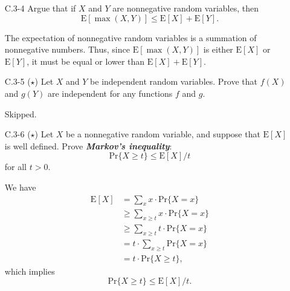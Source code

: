 \begin{enumerate}
\item[C.3{-}4]{Argue that if $X$ and $Y$ are nonnegative random variables, then
\[
  \text{E}[\max(X, Y)] \le \text{E}[X] + \text{E}[Y].
\]
}

\begin{framed}
The expectation of nonnegative random variables is a summation of nonnegative
numbers. Thus, since $\text{E}[\max(X, Y)]$ is either $\text{E}[X]$ or
$\text{E}[Y]$, it must be equal or lower than $\text{E}[X] + \text{E}[Y]$.
\end{framed}

\item[C.3{-}5]{($\star$) Let $X$ and $Y$ be independent random variables. Prove
that $f(X)$ and $g(Y)$ are independent for any functions $f$ and $g$.}

\begin{framed}
Skipped.


\end{framed}

\item[C.3{-}6]{($\star$) Let $X$ be a nonnegative random variable, and suppose
that $\text{E}[X]$ is well defined. Prove \textbf{\emph{Markov's inequality}}:
\[
  \text{Pr}\{X \ge t\} \le \text{E}[X]/t
\]
for all $t > 0$.
}

\begin{framed}
We have
\begin{equation*}
\begin{aligned}
  \text{E}[X] &=   \sum_{x}{x \cdot \text{Pr}\{X = x\}}\\
              &\ge \sum_{x \ge t}{x \cdot \text{Pr}\{X = x\}}\\
              &\ge \sum_{x \ge t}{t \cdot \text{Pr}\{X = x\}}\\
              &= t \cdot \sum_{x \ge t}{\text{Pr}\{X = x\}}\\
              &= t \cdot \text{Pr}\{X \ge t\},
\end{aligned}
\end{equation*}
which implies
\[
  \text{Pr}\{X \ge t\} \le \text{E}[X]/t.
\]
\end{framed}


\end{enumerate}
